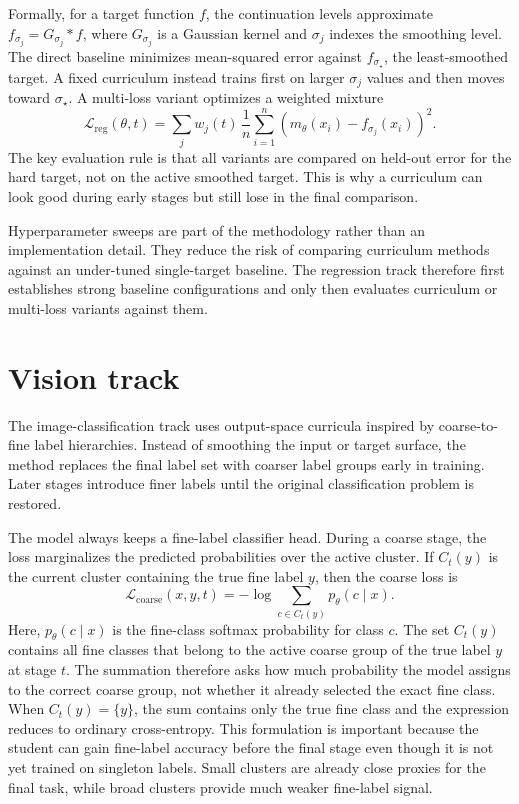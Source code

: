 \documentclass[english,master,a4paper,oneside]{ppfcmthesis}
\begin{document}
Formally, for a target function \(f\), the continuation levels approximate
\(f_{\sigma_j} = G_{\sigma_j} * f\), where \(G_{\sigma_j}\) is a Gaussian kernel
and \(\sigma_j\) indexes the smoothing level. The direct baseline minimizes
mean-squared error against \(f_{\sigma_\star}\), the least-smoothed target. A
fixed curriculum instead trains first on larger \(\sigma_j\) values and then
moves toward \(\sigma_\star\). A multi-loss variant optimizes a weighted mixture
\begin{equation}
    \mathcal{L}_{\mathrm{reg}}(\theta, t)
    = \sum_j w_j(t)\,\frac{1}{n}\sum_{i=1}^{n}
      \left(m_\theta(x_i) - f_{\sigma_j}(x_i)\right)^2 .
\end{equation}
The key evaluation rule is that all variants are compared on held-out error for
the hard target, not on the active smoothed target. This is why a curriculum can
look good during early stages but still lose in the final comparison.

Hyperparameter sweeps are part of the methodology rather than an implementation
detail. They reduce the risk of comparing curriculum methods against an
under-tuned single-target baseline. The regression track therefore first
establishes strong baseline configurations and only then evaluates curriculum or
multi-loss variants against them.

\section{Vision track}

The image-classification track uses output-space curricula inspired by
coarse-to-fine label hierarchies. Instead of smoothing the input or target
surface, the method replaces the final label set with coarser label groups early
in training. Later stages introduce finer labels until the original
classification problem is restored.

The model always keeps a fine-label classifier head. During a coarse stage, the
loss marginalizes the predicted probabilities over the active cluster. If
\(C_t(y)\) is the current cluster containing the true fine label \(y\), then the
coarse loss is
\begin{equation}
    \mathcal{L}_{\mathrm{coarse}}(x,y,t)
    = -\log \sum_{c \in C_t(y)} p_\theta(c \mid x).
\end{equation}
Here, \(p_\theta(c \mid x)\) is the fine-class softmax probability for class
\(c\). The set \(C_t(y)\) contains all fine classes that belong to the active
coarse group of the true label \(y\) at stage \(t\). The summation therefore asks
how much probability the model assigns to the correct coarse group, not whether
it already selected the exact fine class. When \(C_t(y)=\{y\}\), the sum contains
only the true fine class and the expression reduces to ordinary cross-entropy.
This formulation is important because the student can gain fine-label accuracy
before the final stage even though it is not yet trained on singleton labels.
Small clusters are already close proxies for the final task, while broad
clusters provide much weaker fine-label signal.
\end{document}
